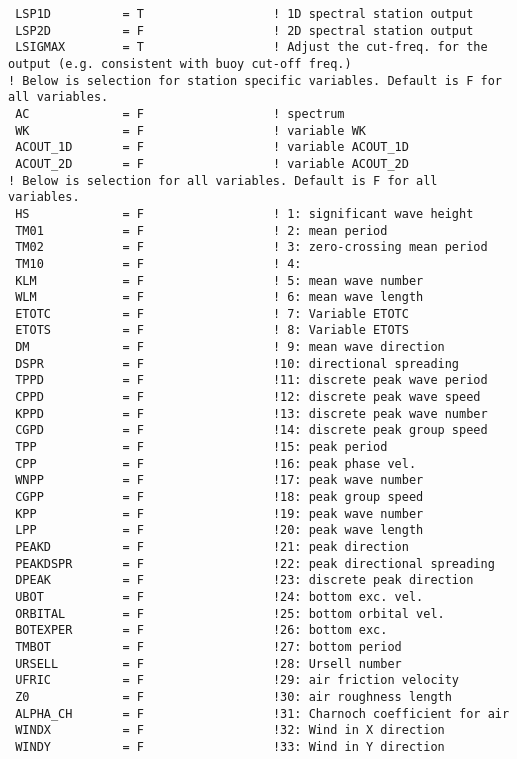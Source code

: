 \documentclass[12pt]{amsart}
\begin{document}
\begin{verbatim}
 LSP1D          = T                  ! 1D spectral station output
 LSP2D          = F                  ! 2D spectral station output
 LSIGMAX        = T                  ! Adjust the cut-freq. for the output (e.g. consistent with buoy cut-off freq.)
! Below is selection for station specific variables. Default is F for all variables.
 AC             = F                  ! spectrum 
 WK             = F                  ! variable WK
 ACOUT_1D       = F                  ! variable ACOUT_1D
 ACOUT_2D       = F                  ! variable ACOUT_2D
! Below is selection for all variables. Default is F for all variables.
 HS             = F                  ! 1: significant wave height
 TM01           = F                  ! 2: mean period
 TM02           = F                  ! 3: zero-crossing mean period
 TM10           = F                  ! 4: 
 KLM            = F                  ! 5: mean wave number
 WLM            = F                  ! 6: mean wave length
 ETOTC          = F                  ! 7: Variable ETOTC
 ETOTS          = F                  ! 8: Variable ETOTS
 DM             = F                  ! 9: mean wave direction
 DSPR           = F                  !10: directional spreading
 TPPD           = F                  !11: discrete peak wave period
 CPPD           = F                  !12: discrete peak wave speed
 KPPD           = F                  !13: discrete peak wave number
 CGPD           = F                  !14: discrete peak group speed
 TPP            = F                  !15: peak period  
 CPP            = F                  !16: peak phase vel. 
 WNPP           = F                  !17: peak wave number
 CGPP           = F                  !18: peak group speed
 KPP            = F                  !19: peak wave number
 LPP            = F                  !20: peak wave length 
 PEAKD          = F                  !21: peak direction
 PEAKDSPR       = F                  !22: peak directional spreading
 DPEAK          = F                  !23: discrete peak direction 
 UBOT           = F                  !24: bottom exc. vel. 
 ORBITAL        = F                  !25: bottom orbital vel. 
 BOTEXPER       = F                  !26: bottom exc.  
 TMBOT          = F                  !27: bottom period 
 URSELL         = F                  !28: Ursell number
 UFRIC          = F                  !29: air friction velocity
 Z0             = F                  !30: air roughness length
 ALPHA_CH       = F                  !31: Charnoch coefficient for air
 WINDX          = F                  !32: Wind in X direction
 WINDY          = F                  !33: Wind in Y direction

\end{verbatim}
\end{document}

